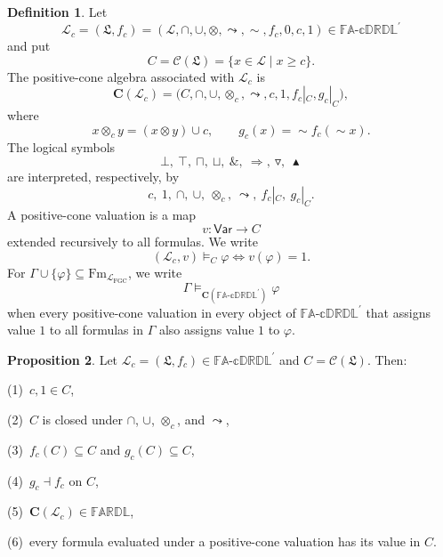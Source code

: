 \documentclass[final,12pt,times]{elsarticle}
\theoremstyle{plain}
\theoremstyle{definition}
\newtheorem{definition}{Definition}[section]
\newtheorem{proposition}[definition]{Proposition}
\theoremstyle{break}
\newcommand{\FARDL}{\mathbb{FARDL}}
\newcommand{\CFADp}{\mathbb{FA\text{-}cDRDL}^{\prime}}
\newcommand{\Cfun}{\mathbf C}
\begin{document}
\begin{definition}
\label{def:positive-cone-valuation}
Let
\[
 \mathcal{\mathscr L}_c=(\boldsymbol{\mathfrak L},f_c)
 = (\mathcal{L},\cap,\cup,\otimes,\leadsto,{\sim},
    f_c,0,c,1)
 \in\CFADp
\]
and put
\[
 C=\mathcal C(\boldsymbol{\mathfrak L})
   =\{x\in \mathcal{L}\mid x\geq c\}.
\]
The positive-cone algebra associated with \(\mathcal{\mathscr L}_c\) is
\[
 \Cfun(\mathcal{\mathscr L}_c)
 =\bigl(C,\cap,\cup,\otimes_c,\leadsto,c,1,
        f_c|_C,g_c|_C\bigr),
\]
where
\[
 x\otimes_c y=(x\otimes y)\cup c,
 \qquad
 g_c(x)={\sim}f_c({\sim}x).
\]
The logical symbols
\[
 \bot,\ \top,\ \sqcap,\ \sqcup,\ \mathbin{\&},\ \Rightarrow,
 \ \triangledown,\ \blacktriangle
\]
are interpreted, respectively, by
\[
 c,\ 1,\ \cap,\ \cup,\ \otimes_c,\ \leadsto,
 \ f_c|_C,\ g_c|_C.
\]
A positive-cone valuation is a map
\[
 v:\mathsf{Var}\longrightarrow C
\]
extended recursively to all formulas.  We write
\[
 (\mathcal{\mathscr L}_c,v)\models_C\varphi
 \Longleftrightarrow
 v(\varphi)=1.
\]
For \(\Gamma\cup\{\varphi\}\subseteq
\mathrm{Fm}_{\mathcal L_{\mathrm{FGC}}}\), we write
\[
 \Gamma\models_{\Cfun(\CFADp)}\varphi
\]
when every positive-cone valuation in every object of \(\CFADp\) that assigns
value \(1\) to all formulas in \(\Gamma\) also assigns value \(1\) to
\(\varphi\).
\end{definition}

\begin{proposition}
\label{prop:positive-cone-well-defined}
Let \(\mathcal{\mathscr L}_c=(\boldsymbol{\mathfrak L},f_c)\in\CFADp\) and
\(C=\mathcal C(\boldsymbol{\mathfrak L})\).  Then:

(1)\ \(c,1\in C\),

(2)\ \(C\) is closed under \(\cap\), \(\cup\), \(\otimes_c\), and
      \(\leadsto\),
      
(3)\ \(f_c(C)\subseteq C\) and \(g_c(C)\subseteq C\),

(4)\ \(g_c\dashv f_c\) on \(C\),

(5)\ \(\Cfun(\mathcal{\mathscr L}_c)\in\FARDL\),

(6)\ every formula evaluated under a positive-cone valuation has its value
      in \(C\).
\end{proposition}
\end{document}
